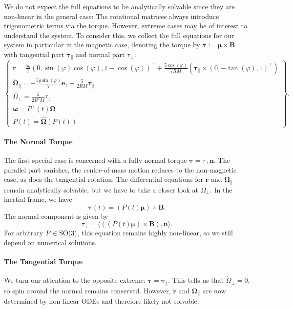 We do not expect the full equations to be analytically solvable since they are non-linear in the general case: The rotational matrices always introduce trigonometric terms via the torque. However, extreme cases may be of interest to understand the system.
To consider this, we collect the full equations for our system in particular in the magnetic case, denoting the torque by $\bm{\tau}:=\bm{\mu} \times \bm{B}$ with tangential part $\bm{\tau}_\|$ and normal part $\tau_\perp$:
\begin{equation*}
    \left.\begin{cases}
            \ddot{\bm{r}} = \frac{5g}{7}(0, \sin (\varphi) \cos (\varphi), 1-\cos(\varphi))^\top + \frac{5\cos(\varphi)}{7RM}(\bm{\tau}_\| \times (0,-\tan (\varphi),1)^\top)\\
            \dot{\bm{\Omega}}_\| = -\frac{5g\sin(\varphi)}{7}\bm{e}_1 + \frac{5}{2RM} \bm{\tau}_\|\\
            \dot{\Omega}_\perp = \frac{5}{2R^2M} \tau_\perp\\
    \bm{\omega} = P^\top(t)\bm{\Omega}\\
    \dot{P}(t)= \widehat{\bm{\Omega}}(P(t))
    \end{cases} 
\right\}.
\end{equation*}
\paragraph*{The Normal Torque}
The first special case is concerned with a fully normal torque $\bm{\tau}=\tau_\perp \bm{n}$. The parallel part vanishes, the centre-of-mass motion reduces to the non-magnetic case, as does the tangential rotation. The differential equations for $\ddot{\bm{r}}$ and $\dot{\bm{\Omega}}_\|$ remain analytically solvable, but we have to take a closer look at $\dot{\Omega}_\perp$. In the inertial frame, we have \[
    \bm{\tau}(t)=(P(t)\bm{\mu}) \times \bm{B}
.\] The normal component is given by \[
\tau_\perp= \langle ((P(t)\bm{\mu})\times \bm{B}), \bm{n} \rangle 
.\] For arbitrary $P \in \operatorname{SO}(3)$, this equation remains highly non-linear, so we still depend on numerical solutions.
\paragraph*{The Tangential Torque}
We turn our attention to the opposite extreme: $\bm{\tau}=\bm{\tau}_\|$. This tells us that $\dot{\Omega}_\perp=0$, so spin around the normal remains conserved. However, $\ddot{\bm{r}}$ and $\dot{\bm{\Omega}}_\|$ are now determined by non-linear ODEs and therefore likely not solvable. 
